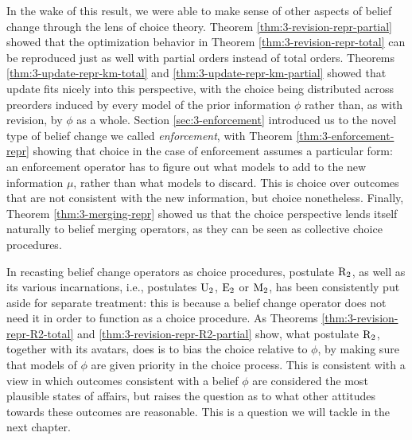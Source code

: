 In the wake of this result, we were able to make sense of other 
aspects of belief change through the lens of choice theory.
Theorem \ref{thm:3-revision-repr-partial}
showed that the optimization behavior 
in Theorem \ref{thm:3-revision-repr-total}
can be reproduced just as well with partial orders
instead of total orders.
Theorems \ref{thm:3-update-repr-km-total} and 
\ref{thm:3-update-repr-km-partial} showed that 
update fits nicely into this perspective,
with the choice being distributed across 
preorders induced by every model of 
the prior information $\phi$ 
rather than, as with revision, 
by $\phi$ as a whole.
Section \ref{sec:3-enforcement} introduced us 
to the novel type of belief change we called 
\emph{enforcement},
with Theorem \ref{thm:3-enforcement-repr} showing 
that choice in the case of enforcement assumes a
particular form: an enforcement operator has to 
figure out what models to add to the new information 
$\mu$, rather than what models to discard.
This is choice over outcomes that are not consistent 
with the new information, but choice nonetheless.
Finally, Theorem \ref{thm:3-merging-repr} showed us that 
the choice perspective lends itself naturally to 
belief merging operators, as they can be seen 
as collective choice procedures.

In recasting belief change operators as choice procedures,
postulate $\mathrm{R}_{2}$, as well as its various incarnations,
i.e., postulates $\mathrm{U}_{2}$, $\mathrm{E}_{2}$ or $\mathrm{M}_{2}$,
has been consistently put aside for separate treatment: 
this is because a belief change operator does not need it 
in order to function as a choice procedure.
As Theorems \ref{thm:3-revision-repr-R2-total}
and \ref{thm:3-revision-repr-R2-partial} show,
what postulate $\mathrm{R}_{2}$, together with its avatars,
does is to bias the choice relative to $\phi$,
by making sure that models of $\phi$ are given 
priority in the choice process.
This is consistent with a view in which outcomes 
consistent with a belief $\phi$ are considered the 
most plausible states of affairs,
but raises the question as to what other attitudes 
towards these outcomes are reasonable.
This is a question we will tackle in the next chapter.

